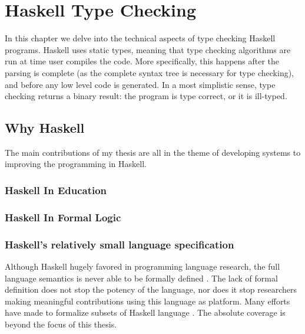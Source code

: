 
\chapter{Haskell Type Checking} %

\label{chap:haskell-type-checking}

\graphicspath{{Figures/HaskellTypeChecking}}
In this chapter we delve into the technical aspects of type checking Haskell programs. Haskell uses static types, meaning that type checking algorithms are run at time user compiles the code. More specifically, this happens after the parsing is complete (as the complete syntax tree is necessary for type checking), and before any low level code is generated. In a most simplistic sense, type checking returns a binary result: the program is type correct, or it is ill-typed.

\section{Why Haskell}

The main contributions of my thesis are all in the theme of developing systems to improving the programming in Haskell. 

\subsection{Haskell In Education}

\subsection{Haskell In Formal Logic}


\subsection{Haskell's relatively small language specification}

Although Haskell hugely favored in programming language research, the full language semantics is never able to be formally defined \cite{Hudak2007-kn}. The lack of formal definition does not stop the potency of the language, nor does it stop researchers making meaningful contributions using this language as platform. Many efforts have made to formalize subsets of Haskell language \cite{FaxEn2002-nd}. The absolute coverage is beyond the focus of this thesis. 





